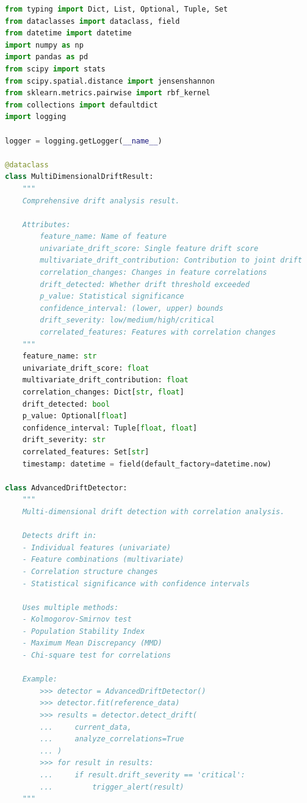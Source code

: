 \begin{lstlisting}[language=Python, caption={Advanced Multi-Dimensional Drift Detector}]
from typing import Dict, List, Optional, Tuple, Set
from dataclasses import dataclass, field
from datetime import datetime
import numpy as np
import pandas as pd
from scipy import stats
from scipy.spatial.distance import jensenshannon
from sklearn.metrics.pairwise import rbf_kernel
from collections import defaultdict
import logging

logger = logging.getLogger(__name__)

@dataclass
class MultiDimensionalDriftResult:
    """
    Comprehensive drift analysis result.

    Attributes:
        feature_name: Name of feature
        univariate_drift_score: Single feature drift score
        multivariate_drift_contribution: Contribution to joint drift
        correlation_changes: Changes in feature correlations
        drift_detected: Whether drift threshold exceeded
        p_value: Statistical significance
        confidence_interval: (lower, upper) bounds
        drift_severity: low/medium/high/critical
        correlated_features: Features with correlation changes
    """
    feature_name: str
    univariate_drift_score: float
    multivariate_drift_contribution: float
    correlation_changes: Dict[str, float]
    drift_detected: bool
    p_value: Optional[float]
    confidence_interval: Tuple[float, float]
    drift_severity: str
    correlated_features: Set[str]
    timestamp: datetime = field(default_factory=datetime.now)

class AdvancedDriftDetector:
    """
    Multi-dimensional drift detection with correlation analysis.

    Detects drift in:
    - Individual features (univariate)
    - Feature combinations (multivariate)
    - Correlation structure changes
    - Statistical significance with confidence intervals

    Uses multiple methods:
    - Kolmogorov-Smirnov test
    - Population Stability Index
    - Maximum Mean Discrepancy (MMD)
    - Chi-square test for correlations

    Example:
        >>> detector = AdvancedDriftDetector()
        >>> detector.fit(reference_data)
        >>> results = detector.detect_drift(
        ...     current_data,
        ...     analyze_correlations=True
        ... )
        >>> for result in results:
        ...     if result.drift_severity == 'critical':
        ...         trigger_alert(result)
    """


\end{lstlisting}
